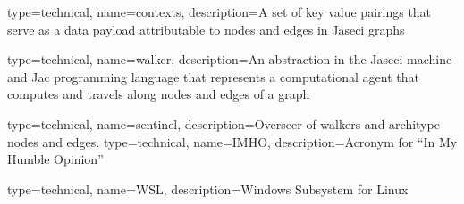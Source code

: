 {
    type=technical,
    name=contexts,
    description={A set of key value pairings that serve as a data payload attributable to nodes and edges in Jaseci graphs}
}

{
    type=technical,
    name=walker,
    description={An abstraction in the Jaseci machine and Jac programming language that represents a computational agent that computes and travels along nodes and edges of a graph}
}

{
    type=technical,
    name=sentinel,
    description={Overseer of walkers and architype nodes and edges.}
}
{
    type=technical,
    name=IMHO,
    description={Acronym for ``In My Humble Opinion''}
}

{
    type=technical,
    name=WSL,
    description={Windows Subsystem for Linux}
}